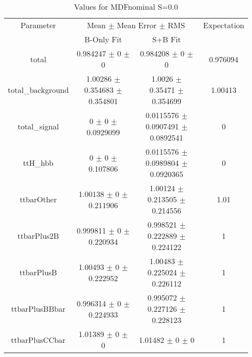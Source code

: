 \begin{table}
\centering
\caption{Values for MDFnominal S=0.0}
\begin{tabular}{cccc}
\toprule
Parameter & \multicolumn{2}{c}{Mean $\pm$ Mean Error $\pm$ RMS} & Expectation\\
 & B-Only Fit & S+B Fit & \\
\midrule
total & \num{0.984247} $\pm$ \num{0} $\pm$ \num{0} & \num{0.984208} $\pm$ \num{0} $\pm$ \num{0} & \num{0.976094}\\
total\_background & \num{1.00286} $\pm$ \num{0.354683} $\pm$ \num{0.354801} & \num{1.0026} $\pm$ \num{0.35471} $\pm$ \num{0.354699} & \num{1.00413}\\
total\_signal & \num{0} $\pm$ \num{0} $\pm$ \num{0.0929099} & \num{0.0115576} $\pm$ \num{0.0907491} $\pm$ \num{0.0892541} & \num{0}\\
ttH\_hbb & \num{0} $\pm$ \num{0} $\pm$ \num{0.107806} & \num{0.0115576} $\pm$ \num{0.0989804} $\pm$ \num{0.0920365} & \num{0}\\
ttbarOther & \num{1.00138} $\pm$ \num{0} $\pm$ \num{0.211906} & \num{1.00124} $\pm$ \num{0.213505} $\pm$ \num{0.214556} & \num{1.01}\\
ttbarPlus2B & \num{0.999811} $\pm$ \num{0} $\pm$ \num{0.220934} & \num{0.998521} $\pm$ \num{0.222889} $\pm$ \num{0.224122} & \num{1}\\
ttbarPlusB & \num{1.00493} $\pm$ \num{0} $\pm$ \num{0.222952} & \num{1.00483} $\pm$ \num{0.225024} $\pm$ \num{0.226112} & \num{1}\\
ttbarPlusBBbar & \num{0.996314} $\pm$ \num{0} $\pm$ \num{0.224933} & \num{0.995072} $\pm$ \num{0.227126} $\pm$ \num{0.228123} & \num{1}\\
ttbarPlusCCbar & \num{1.01389} $\pm$ \num{0} $\pm$ \num{0} & \num{1.01482} $\pm$ \num{0} $\pm$ \num{0} & \num{1}\\
\bottomrule
\end{tabular}
\end{table}